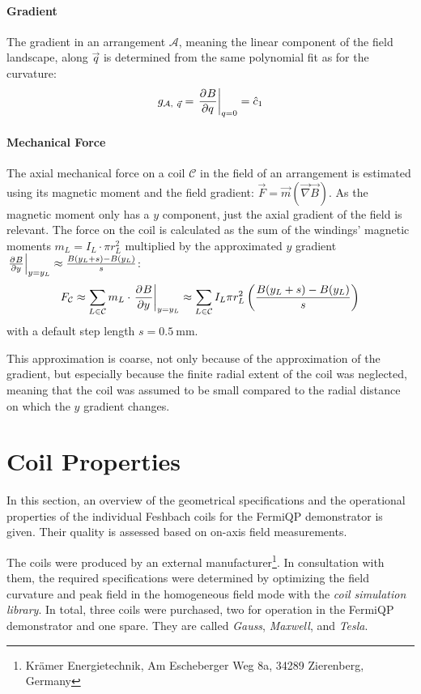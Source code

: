 \paragraph{Gradient}
The gradient in an arrangement $\mathcal{A}$, meaning the linear component of the field landscape, along $\vec q$ is determined from the same polynomial fit as for the curvature:
\begin{align}\label{eq:gradient_simulation}
    g_{\mathcal{A},~\vec q} = \eval{\pdv[]{B}{q}}_{q = 0} = \hat c_1
\end{align}

\paragraph{Mechanical Force}
The axial mechanical force on a coil $\mathcal{C}$ in the field of an arrangement is estimated using its magnetic moment and the field gradient: $\vec F = \vec m (\vec \nabla \vec B)$. As the magnetic moment only has a $y$ component, just the axial gradient of the field is relevant. The force on the coil is calculated as the sum of the windings' magnetic moments $m_L = I_L \cdot \pi r_L^2$ multiplied by the approximated $y$ gradient $\eval{\pdv[]{B}{y}}_{y = y_L} \approx \frac{B(y_L + s) - B(y_L)}{s}$:
\begin{align}\label{eq:mechanical_force_simulation}
    F_\mathcal{C} \approx \sum\limits_{L \in \mathcal{C}} m_L \cdot \eval{\pdv[]{B}{y}}_{y = y_L} \approx \sum\limits_{L \in \mathcal{C}} I_L \pi r_L^2 \left(\frac{B(y_L + s)-B(y_L)}{s}\right)
\end{align}
with a default step length $s = \SI{0.5}{\milli\meter}$.

This approximation is coarse, not only because of the approximation of the gradient, but especially because the finite radial extent of the coil was neglected, meaning that the coil was assumed to be small compared to the radial distance on which the $y$ gradient changes.




\section{Coil Properties}\label{ch:coil_properties}
In this section, an overview of the geometrical specifications and the operational properties of the individual Fesh\-bach coils for the FermiQP demonstrator is given. Their quality is assessed based on on-axis field measurements.

The coils were produced by an external manufacturer\footnote{Krämer Energietechnik, Am Escheberger Weg 8a, 34289 Zierenberg, Germany}. In consultation with them, the required specifications were determined by optimizing the field curvature and peak field in the homogeneous field mode with the \textit{coil simulation library}. In total, three coils were purchased, two for operation in the FermiQP demonstrator and one spare. They are called \textit{Gauss}, \textit{Maxwell}, and \textit{Tesla}.

